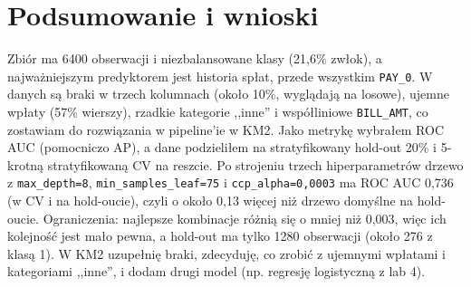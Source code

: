 \documentclass[a4paper,10pt]{article}
\begin{document}
\section{Podsumowanie i wnioski}

Zbiór ma 6400 obserwacji i niezbalansowane klasy (21,6\% zwłok), a najważniejszym predyktorem jest historia spłat, przede wszystkim \texttt{PAY\_0}. W danych są braki w trzech kolumnach (około 10\%, wyglądają na losowe), ujemne wpłaty (57\% wierszy), rzadkie kategorie ,,inne'' i współliniowe \texttt{BILL\_AMT}, co zostawiam do rozwiązania w pipeline'ie w KM2. Jako metrykę wybrałem ROC AUC (pomocniczo AP), a dane podzieliłem na stratyfikowany hold-out 20\% i 5-krotną stratyfikowaną CV na reszcie. Po strojeniu trzech hiperparametrów drzewo z \texttt{max\_depth=8}, \texttt{min\_samples\_leaf=75} i \texttt{ccp\_alpha=0,0003} ma ROC AUC 0,736 (w CV i na hold-oucie), czyli o około 0,13 więcej niż drzewo domyślne na hold-oucie. Ograniczenia: najlepsze kombinacje różnią się o mniej niż 0,003, więc ich kolejność jest mało pewna, a hold-out ma tylko 1280 obserwacji (około 276 z klasą 1). W KM2 uzupełnię braki, zdecyduję, co zrobić z ujemnymi wpłatami i kategoriami ,,inne'', i dodam drugi model (np. regresję logistyczną z lab 4).

\end{document}
